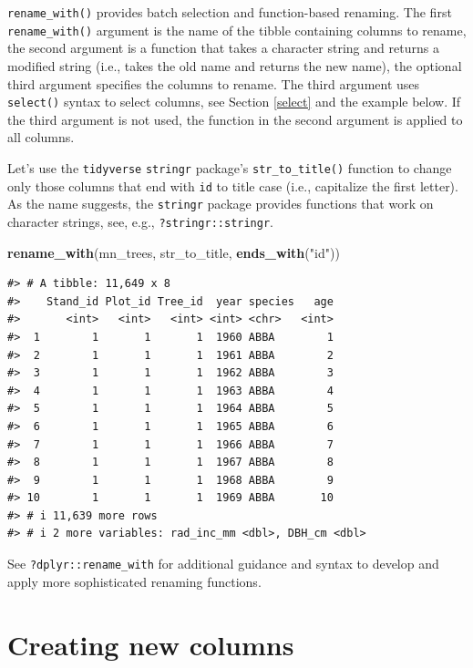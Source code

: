\documentclass[
  11pt,
]{krantz}
\newenvironment{Shaded}{\begin{snugshade}}{\end{snugshade}}
\newcommand{\KeywordTok}[1]{\textcolor[rgb]{0.13,0.29,0.53}{\textbf{#1}}}
\newcommand{\NormalTok}[1]{#1}
\newcommand{\StringTok}[1]{\textcolor[rgb]{0.31,0.60,0.02}{#1}}
\theoremstyle{definition}
\theoremstyle{definition}
\theoremstyle{definition}
\theoremstyle{definition}
\theoremstyle{remark}
\begin{document}
\texttt{rename\_with()} provides batch selection and function-based renaming. The first \texttt{rename\_with()} argument is the name of the tibble containing columns to rename, the second argument is a function that takes a character string and returns a modified string (i.e., takes the old name and returns the new name), the optional third argument specifies the columns to rename. The third argument uses \texttt{select()} syntax to select columns, see Section \ref{select} and the example below. If the third argument is not used, the function in the second argument is applied to all columns.

Let's use the \texttt{tidyverse} \texttt{stringr} package's \texttt{str\_to\_title()} function to change only those columns that end with \texttt{id} to title case (i.e., capitalize the first letter). As the name suggests, the \texttt{stringr} package provides functions that work on character strings, see, e.g., \texttt{?stringr::stringr}.

\begin{Shaded}
\begin{Highlighting}[]
\KeywordTok{rename\_with}\NormalTok{(mn\_trees, str\_to\_title, }\KeywordTok{ends\_with}\NormalTok{(}\StringTok{"id"}\NormalTok{))}
\end{Highlighting}
\end{Shaded}

\begin{verbatim}
#> # A tibble: 11,649 x 8
#>    Stand_id Plot_id Tree_id  year species   age
#>       <int>   <int>   <int> <int> <chr>   <int>
#>  1        1       1       1  1960 ABBA        1
#>  2        1       1       1  1961 ABBA        2
#>  3        1       1       1  1962 ABBA        3
#>  4        1       1       1  1963 ABBA        4
#>  5        1       1       1  1964 ABBA        5
#>  6        1       1       1  1965 ABBA        6
#>  7        1       1       1  1966 ABBA        7
#>  8        1       1       1  1967 ABBA        8
#>  9        1       1       1  1968 ABBA        9
#> 10        1       1       1  1969 ABBA       10
#> # i 11,639 more rows
#> # i 2 more variables: rad_inc_mm <dbl>, DBH_cm <dbl>
\end{verbatim}

See \texttt{?dplyr::rename\_with} for additional guidance and syntax to develop and apply more sophisticated renaming functions.

\hypertarget{mutate}{%
\section{Creating new columns}\label{mutate}}
\end{document}
